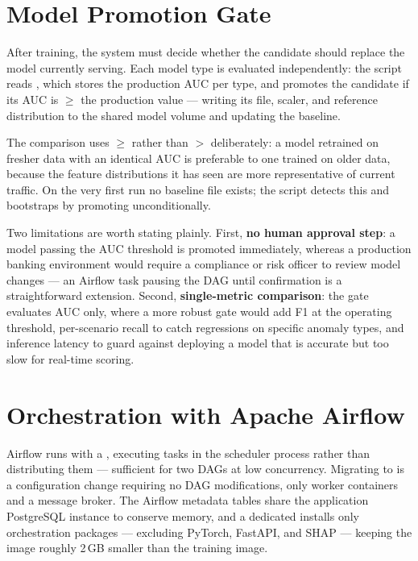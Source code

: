 \section{Model Promotion Gate}

After training, the system must decide whether the candidate should replace the model currently serving. Each model type is evaluated independently: the script reads , which stores the production AUC per type, and promotes the candidate if its AUC is $\geq$ the production value --- writing its  file, scaler, and reference distribution to the shared model volume and updating the baseline.

The comparison uses $\geq$ rather than $>$ deliberately: a model retrained on fresher data with an identical AUC is preferable to one trained on older data, because the feature distributions it has seen are more representative of current traffic. On the very first run no baseline file exists; the script detects this and bootstraps by promoting unconditionally.

Two limitations are worth stating plainly. First, \textbf{no human approval step}: a model passing the AUC threshold is promoted immediately, whereas a production banking environment would require a compliance or risk officer to review model changes --- an Airflow task pausing the DAG until confirmation is a straightforward extension. Second, \textbf{single-metric comparison}: the gate evaluates AUC only, where a more robust gate would add F1 at the operating threshold, per-scenario recall to catch regressions on specific anomaly types, and inference latency to guard against deploying a model that is accurate but too slow for real-time scoring.

\section{Orchestration with Apache Airflow}

Airflow runs with a , executing tasks in the scheduler process rather than distributing them --- sufficient for two DAGs at low concurrency. Migrating to  is a configuration change requiring no DAG modifications, only worker containers and a message broker. The Airflow metadata tables share the application PostgreSQL instance to conserve memory, and a dedicated  installs only orchestration packages --- excluding PyTorch, FastAPI, and SHAP --- keeping the image roughly 2\,GB smaller than the training image.

